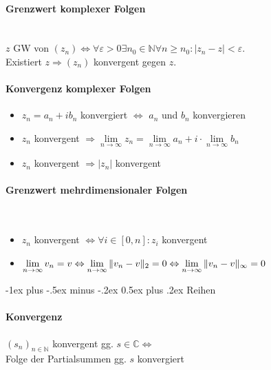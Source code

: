 \documentclass[paper=a3,paper=landscape, fontsize=9pt, DIV=30]{scrartcl}
\makeatletter
\newcommand{\compl}{\mathbb{C}}
\newcommand{\nat}{\mathbb{N}}
\newcommand{\srow}{(s_n)_{n \in \nat}}
\renewcommand{\section}{\@startsection{section}{1}{0mm}%
  {-1ex plus -.5ex minus -.2ex}%
  {0.5ex plus .2ex}%
  {\color{blue}\normalfont\large\bfseries}}
\makeatother
\begin{document}
\begin{multicols*}{4}
\paragraph{Grenzwert komplexer Folgen}\hspace{0pt} \\
$z$ GW von $(z_n) \Leftrightarrow \forall \varepsilon > 0 \exists n_0 \in \nat \forall n \geq n_0: |z_n - z| < \varepsilon$.\\Existiert $z \Rightarrow (z_n)$ konvergent gegen $z$.


\paragraph{Konvergenz komplexer Folgen}
\begin{itemize}
	\item $z_n = a_n + ib_n$ konvergiert $\Leftrightarrow$ $a_n$ und $b_n$ konvergieren
	\item $z_n$ konvergent $\Rightarrow \lim\limits_{n \rightarrow \infty} z_n = \lim\limits_{n \rightarrow \infty} a_n + i \cdot \lim\limits_{n \rightarrow \infty} b_n$
	\item $z_n$ konvergent $\Rightarrow \lvert z_n \rvert$ konvergent
\end{itemize}


\paragraph{Grenzwert mehrdimensionaler Folgen}\hspace{0pt} \\
\begin{itemize}
	\item $z_n$ konvergent $\Leftrightarrow \forall i \in [0, n] : z_i$ konvergent
	\item $\lim\limits_{n \rightarrow \infty} v_n = v \Leftrightarrow \lim\limits_{n \rightarrow \infty} \Arrowvert v_n - v\Arrowvert_2 = 0 \Leftrightarrow \lim\limits_{n \rightarrow \infty} \Arrowvert v_n - v\Arrowvert_\infty = 0 $
\end{itemize}


  \section{Reihen}

  \paragraph{Konvergenz}
  $\srow$ konvergent gg. $s \in \compl \Leftrightarrow$\\Folge der Partialsummen gg. $s$ konvergiert


\end{multicols*}
\end{document}
